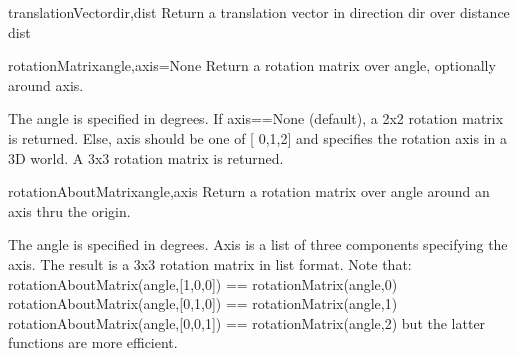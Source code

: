 \begin{funcdesc}{translationVector}{dir,dist}
    Return a translation vector in direction dir over distance dist
\end{funcdesc}

\begin{funcdesc}{rotationMatrix}{angle,axis=None}
    Return a rotation matrix over angle, optionally around axis.

    The angle is specified in degrees.
    If axis==None (default), a 2x2 rotation matrix is returned.
    Else, axis should be one of [ 0,1,2] and specifies the rotation axis
    in a 3D world. A 3x3 rotation matrix is returned.
\end{funcdesc}
    

\begin{funcdesc}{rotationAboutMatrix}{angle,axis}
    Return a rotation matrix over angle around an axis thru the origin.

    The angle is specified in degrees.
    Axis is a list of three components specifying the axis.
    The result is a 3x3 rotation matrix in list format.
    Note that:
      rotationAboutMatrix(angle,[1,0,0]) == rotationMatrix(angle,0) 
      rotationAboutMatrix(angle,[0,1,0]) == rotationMatrix(angle,1) 
      rotationAboutMatrix(angle,[0,0,1]) == rotationMatrix(angle,2)
    but the latter functions are more efficient.
\end{funcdesc}
    


